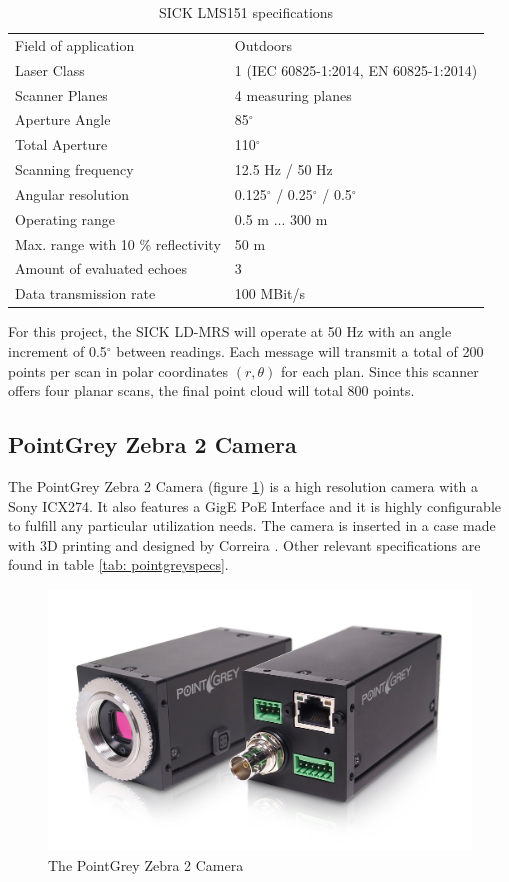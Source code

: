 \begin{table}[!h]
	\centering
	\caption{SICK LMS151 specifications}
	\label{tab: sickldmrsspecs}
	\begin{tabular}{ll}
		\hline
		Field of application & Outdoors\\
		Laser Class & 	1 (IEC 60825-1:2014, EN 60825-1:2014) \\
		Scanner Planes & 4 measuring planes \\
		Aperture Angle & 85$^{\circ}$  \\
		Total Aperture & 110$^{\circ}$\\
		Scanning frequency & 12.5 Hz / 50 Hz \\
		Angular resolution	& 0.125$^{\circ}$ / 0.25$^{\circ}$ / 0.5$^{\circ}$ \\
		Operating range	& 0.5 m ... 300 m \\
		Max. range with 10 \% reflectivity & 50 m \\
		Amount of evaluated echoes & 3 \\
		Data transmission rate & 100 MBit/s \\
		\hline
	\end{tabular}
\end{table}

For this project, the SICK LD-MRS will operate at 50 Hz with an angle increment of 0.5$^{\circ}$ between readings. Each message will transmit a total of 200 points per scan in polar coordinates $(r,\theta)$ for each plan. Since this scanner offers four planar scans, the final point cloud will total 800 points. \cite{SICKa}

\subsection{PointGrey Zebra 2 Camera}

The PointGrey Zebra 2 Camera (figure \ref{fig:pointgrey}) is a high resolution camera with a Sony ICX274. It also features a GigE PoE Interface and it is highly configurable to fulfill any particular utilization needs. \cite{PointGrey} The camera is inserted in a case made with 3D printing and designed by Correira \cite{Correia2017}.  Other relevant specifications are found in table \ref{tab: pointgreyspecs}. 

\begin{figure}[htp]
	
	\centering
	\includegraphics[width=.6\textwidth]{capexp/imgs/pointgrey}
	
	\caption{The PointGrey Zebra 2 Camera}
	\label{fig:pointgrey}
	
\end{figure}

